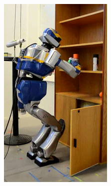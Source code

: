\begin{figure}
\begin{subfigure}{0.19\columnwidth}
    \includegraphics[width = \columnwidth]
                    {src/chap3-optimal-motion-planning/figure/shelves-9.png}
    \label{shelves-9}
  \end{subfigure}
  \begin{subfigure}{0.19\columnwidth}
    \centering

\end{subfigure}
\end{figure}
